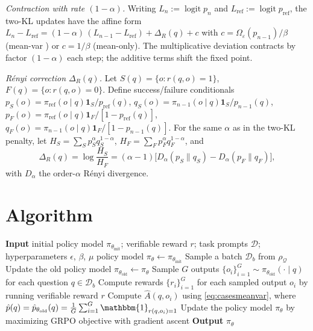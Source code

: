 \documentclass[11pt,reqno]{amsart}
\newcommand{\Om}{\Omega}
\DeclareMathOperator{\logit}{logit}
\begin{document}
\noindent\textit{Contraction with rate $(1-\alpha)$.} Writing $L_n:=\logit p_n$ and $L_{\mathrm{ref}}:=\logit p_{\mathrm{ref}}$, the two-KL updates have the affine form
$L_n-L_{\mathrm{ref}}=(1-\alpha)\,(L_{n-1}-L_{\mathrm{ref}})+\Delta_R(q)+c$
with $c=\Om_\varepsilon(p_{n-1})/\beta$ (mean-var ) or $c=1/\beta$ (mean-only). The multiplicative deviation contracts by factor $(1-\alpha)$ each step; the additive terms shift the fixed point.

\noindent\textit{Rényi correction $\Delta_R(q)$.} Let $S(q)=\{o:r(q,o)=1\}$, $F(q)=\{o:r(q,o)=0\}$. Define success/failure conditionals
$p_S(o)=\pi_{\mathrm{ref}}(o\mid q)\mathbf 1_S/p_{\mathrm{ref}}(q)$,
$q_S(o)=\pi_{n-1}(o\mid q)\mathbf 1_S/p_{n-1}(q)$,
$p_F(o)=\pi_{\mathrm{ref}}(o\mid q)\mathbf 1_F/[1-p_{\mathrm{ref}}(q)]$,
$q_F(o)=\pi_{n-1}(o\mid q)\mathbf 1_F/[1-p_{n-1}(q)]$.
For the same $\alpha$ as in the two-KL penalty, let
$H_S=\sum_S p_S^\alpha q_S^{1-\alpha}$, $H_F=\sum_F p_F^\alpha q_F^{1-\alpha}$, and
\[
\Delta_R(q)=\log\!\frac{H_S}{H_F}=(\alpha-1)\Big[D_\alpha(p_S\|q_S)-D_\alpha(p_F\|q_F)\Big],
\]
with $D_\alpha$ the order-$\alpha$ Rényi divergence.

\fi



 
\section{Algorithm}\label{sec:alg}
 \begin{algorithm}[!ht]
  \small
  \caption{Iterative GRPO with verifiable rewards, modified from  \citep{shao2024deepseekmath}}

  \begin{algorithmic}[1]
\State  \textbf{Input} initial policy model $\pi_{\theta_{\text{init}}}$; verifiable reward $r$; task prompts $\mathcal{D}$; 
  hyperparameters $\epsilon$, $\beta$, $\mu$
    \State policy model $\pi_\theta \leftarrow \pi_{\theta_{\text{init}}}$
      \State Sample a batch $\mathcal{D}_b$ from $\rho_{\mathcal{Q}}$
      \State Update the old policy model $\pi_{\theta_{\textrm{old}}} \leftarrow \pi_{\theta}$ 
      \State Sample $G$ outputs $\{o_i\}_{i=1}^G \sim \pi_{\theta_{\textrm{old}}} (\cdot \mid q) $ for each question $q \in \mathcal{D}_b$
      \State Compute rewards $\{r_i\}_{i=1}^{G}$ for each sampled output $o_i$ by running verifiable reward $r$ 
      \State Compute $\hat{A}(q,o_i)$ using  \eqref{eq:casesmeanvar}, where $\hat{p}(q) = \hat{p}_{\theta_{\text{old}}}(q) = \frac{1}{G} \sum_{i=1}^G \mathbbm{1}_{r(q,o_i)=1}$
        \State Update the policy model $\pi_{\theta}$ by maximizing GRPO objective with gradient ascent 
      \EndFor
    \EndFor 
    \State \noindent   \textbf{Output} $\pi_\theta$
  \end{algorithmic}
  \label{alg:iter-grpo}
\end{algorithm}
\end{document}
